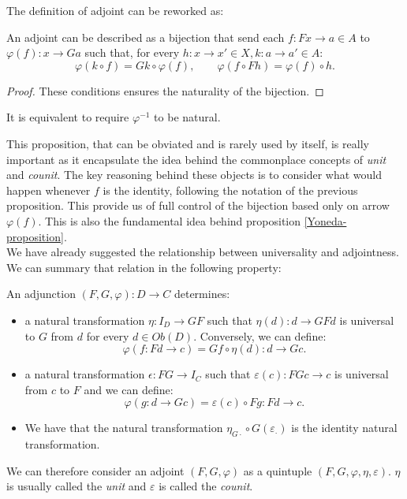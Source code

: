 The definition of adjoint can be reworked as:
\begin{proposition}\label{description:adjoint}
  An adjoint can be described as a bijection that send each $f:Fx\to a\in A$ to $\varphi(f):x\to Ga$ such that, for every $h:x\to x'\in X, k: a\to a'\in A$:
  $$\varphi(k\circ f) = Gk \circ \varphi(f), \qquad \varphi(f\circ Fh) = \varphi(f)\circ h.$$
\end{proposition}
\begin{proof}
  These conditions ensures the naturality of the bijection.
\end{proof}
\begin{remark}
  It is equivalent to require $\varphi^{-1}$ to be natural.
\end{remark}

This proposition, that can be obviated and is rarely used by itself, is really important as it encapsulate the idea behind the commonplace concepts of \emph{unit} and \emph{counit}. The key reasoning behind these objects is to consider what would happen whenever $f$ is the identity, following the notation of the previous proposition. This provide us of full control of the bijection based only on arrow $\varphi(f)$. This is also the fundamental idea behind proposition \ref{Yoneda-proposition}.\\

We have already suggested the relationship between universality and adjointness. We can summary that relation in the following property:
\begin{proposition}\label{prop:univAdjoint}
  An adjunction $(F,G,\varphi): D\to C $ determines:
  \begin{itemize}
  \item a natural transformation $\eta: I_D \to GF$ such that $\eta(d):d\to GFd$ is universal to $G$ from $d$ for every $d\in Ob(D)$. Conversely, we can define:
    $$\varphi(f:Fd\to c) = Gf\circ \eta(d): d\to G c.$$
  \item a natural transformation $\epsilon: FG\to I_C$ such that $\varepsilon(c):FGc\to c$ is universal from $c$ to $F$ and we can define:
    $$\varphi(g:d\to Gc) = \varepsilon(c)\circ Fg: Fd\to c.$$
  \item We have that the natural transformation $\eta_{G\cdot} \circ G(\varepsilon_\cdot)$ is the identity natural transformation.
  \end{itemize}
\end{proposition}
\begin{remark}
  We can therefore consider an adjoint $(F,G,\varphi)$ as a quintuple  $(F,G,\varphi,\eta,\varepsilon)$. $\eta$ is usually called the \emph{unit} and $\varepsilon$ is called the \emph{counit}.
\end{remark}

